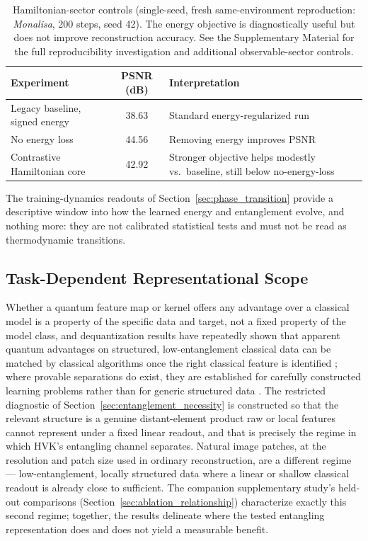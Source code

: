\documentclass[sn-mathphys,Numbered]{sn-jnl}
\begin{document}
\begin{table}[t]
\centering
\caption{Hamiltonian-sector controls (single-seed, fresh same-environment reproduction: \textit{Monalisa}, 200 steps, seed 42). The energy objective is diagnostically useful but does not improve reconstruction accuracy. See the Supplementary Material for the full reproducibility investigation and additional observable-sector controls.}
\label{tab:hamiltonian_controls}
\scriptsize
\begin{tabular}{p{}cp{}}
\toprule
Experiment & PSNR (dB) & Interpretation \\
\midrule
Legacy baseline, signed energy & 38.63 & Standard energy-regularized run \\
No energy loss & 44.56 & Removing energy improves PSNR \\
Contrastive Hamiltonian core & 42.92 & Stronger objective helps modestly vs.\ baseline, still below no-energy-loss \\
\bottomrule
\end{tabular}
\end{table}

The training-dynamics readouts of Section~\ref{sec:phase_transition} provide a descriptive window into how the learned energy and entanglement evolve, and nothing more: they are not calibrated statistical tests and must not be read as thermodynamic transitions.

\subsection{Task-Dependent Representational Scope}
\label{sec:dequant}
Whether a quantum feature map or kernel offers any advantage over a classical model is a property of the specific data and target, not a fixed property of the model class, and dequantization results have repeatedly shown that apparent quantum advantages on structured, low-entanglement classical data can be matched by classical algorithms once the right classical feature is identified \cite{Huang2021PowerData, Tang2019}; where provable separations do exist, they are established for carefully constructed learning problems rather than for generic structured data \cite{Gyurik2023}. The restricted diagnostic of Section~\ref{sec:entanglement_necessity} is constructed so that the relevant structure is a genuine distant-element product raw or local features cannot represent under a fixed linear readout, and that is precisely the regime in which HVK's entangling channel separates. Natural image patches, at the resolution and patch size used in ordinary reconstruction, are a different regime --- low-entanglement, locally structured data where a linear or shallow classical readout is already close to sufficient. The companion supplementary study's held-out comparisons (Section~\ref{sec:ablation_relationship}) characterize exactly this second regime; together, the results delineate where the tested entangling representation does and does not yield a measurable benefit.
\end{document}
